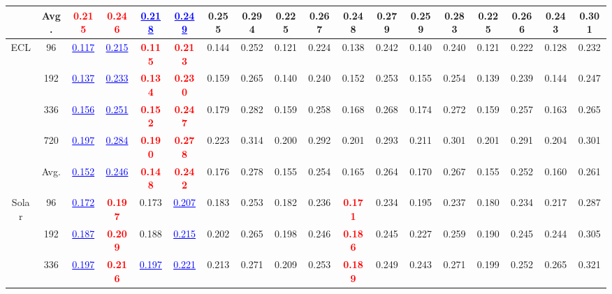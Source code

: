 \begin{table}[t]
{\begin{tabular}{cc|cc|cc|cc|cc|cc|cc|cc|cc}
\cmidrule(lr){2-18}
 & Avg. & \textcolor{red}{\textbf{0.215}} & \textcolor{red}{\textbf{0.246}} & \textcolor{blue}{\underline{0.218}} & \textcolor{blue}{\underline{0.249}} & 0.255 & 0.294 & 0.225 & 0.267 & 0.248 & 0.279 & 0.259 & 0.283 & 0.225 & 0.266 & 0.243 & 0.301 \\
\midrule
\multirow{5}{*}{ECL} & 96 & \textcolor{blue}{\underline{0.117}} & \textcolor{blue}{\underline{0.215}} & \textcolor{red}{\textbf{0.115}} & \textcolor{red}{\textbf{0.213}} & 0.144 & 0.252 & 0.121 & 0.224 & 0.138 & 0.242 & 0.140 & 0.240 & 0.121 & 0.222 & 0.128 & 0.232 \\
 & 192 & \textcolor{blue}{\underline{0.137}} & \textcolor{blue}{\underline{0.233}} & \textcolor{red}{\textbf{0.134}} & \textcolor{red}{\textbf{0.230}} & 0.159 & 0.265 & 0.140 & 0.240 & 0.152 & 0.253 & 0.155 & 0.254 & 0.139 & 0.239 & 0.144 & 0.247 \\
 & 336 & \textcolor{blue}{\underline{0.156}} & \textcolor{blue}{\underline{0.251}} & \textcolor{red}{\textbf{0.152}} & \textcolor{red}{\textbf{0.247}} & 0.179 & 0.282 & 0.159 & 0.258 & 0.168 & 0.268 & 0.174 & 0.272 & 0.159 & 0.257 & 0.163 & 0.265 \\
 & 720 & \textcolor{blue}{\underline{0.197}} & \textcolor{blue}{\underline{0.284}} & \textcolor{red}{\textbf{0.190}} & \textcolor{red}{\textbf{0.278}} & 0.223 & 0.314 & 0.200 & 0.292 & 0.201 & 0.293 & 0.211 & 0.301 & 0.201 & 0.291 & 0.204 & 0.301 \\
\cmidrule(lr){2-18}
 & Avg. & \textcolor{blue}{\underline{0.152}} & \textcolor{blue}{\underline{0.246}} & \textcolor{red}{\textbf{0.148}} & \textcolor{red}{\textbf{0.242}} & 0.176 & 0.278 & 0.155 & 0.254 & 0.165 & 0.264 & 0.170 & 0.267 & 0.155 & 0.252 & 0.160 & 0.261 \\
\midrule
\multirow{5}{*}{Solar} & 96 & \textcolor{blue}{\underline{0.172}} & \textcolor{red}{\textbf{0.197}} & 0.173 & \textcolor{blue}{\underline{0.207}} & 0.183 & 0.253 & 0.182 & 0.236 & \textcolor{red}{\textbf{0.171}} & 0.234 & 0.195 & 0.237 & 0.180 & 0.234 & 0.217 & 0.287 \\
 & 192 & \textcolor{blue}{\underline{0.187}} & \textcolor{red}{\textbf{0.209}} & 0.188 & \textcolor{blue}{\underline{0.215}} & 0.202 & 0.265 & 0.198 & 0.246 & \textcolor{red}{\textbf{0.186}} & 0.245 & 0.227 & 0.259 & 0.190 & 0.245 & 0.244 & 0.305 \\
 & 336 & \textcolor{blue}{\underline{0.197}} & \textcolor{red}{\textbf{0.216}} & \textcolor{blue}{\underline{0.197}} & \textcolor{blue}{\underline{0.221}} & 0.213 & 0.271 & 0.209 & 0.253 & \textcolor{red}{\textbf{0.189}} & 0.249 & 0.243 & 0.271 & 0.199 & 0.252 & 0.265 & 0.321 \\

\end{tabular}}
\end{table}
